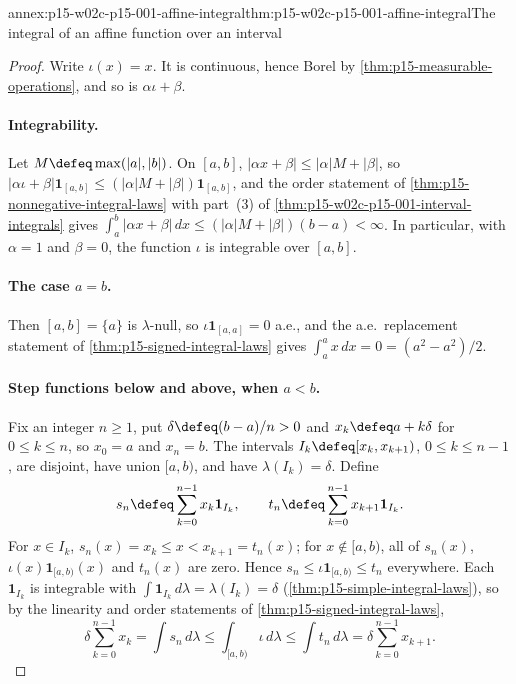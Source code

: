 \begin{annexitem}{annex:p15-w02c-p15-001-affine-integral}{thm:p15-w02c-p15-001-affine-integral}{The integral of an affine function over an interval}
\begin{proof}
Write \(\iota(x)=x\). It is continuous, hence Borel by
\cref{thm:p15-measurable-operations}, and so is \(\alpha\iota+\beta\).

\paragraph{Integrability.}
Let \(M\defeq\max(|a|,|b|)\). On \([a,b]\),
\(|\alpha x+\beta|\leq|\alpha|M+|\beta|\), so
\(|\alpha\iota+\beta|\mathbf1_{[a,b]}\leq(|\alpha|M+|\beta|)\mathbf1_{[a,b]}\),
and the order statement of \cref{thm:p15-nonnegative-integral-laws} with
part~(3) of \cref{thm:p15-w02c-p15-001-interval-integrals} gives
\(\int_a^b|\alpha x+\beta|\,dx\leq(|\alpha|M+|\beta|)(b-a)<\infty\). In
particular, with \(\alpha=1\) and \(\beta=0\), the function \(\iota\) is
integrable over \([a,b]\).

\paragraph{The case \(a=b\).}
Then \([a,b]=\{a\}\) is \(\lambda\)-null, so
\(\iota\mathbf1_{[a,a]}=0\) a.e., and the a.e.\ replacement statement of
\cref{thm:p15-signed-integral-laws} gives \(\int_a^ax\,dx=0=(a^2-a^2)/2\).

\paragraph{Step functions below and above, when \(a<b\).}
Fix an integer \(n\geq1\), put \(\delta\defeq(b-a)/n>0\) and
\(x_k\defeq a+k\delta\) for \(0\leq k\leq n\), so \(x_0=a\) and
\(x_n=b\). The intervals \(I_k\defeq[x_k,x_{k+1})\),
\(0\leq k\leq n-1\), are disjoint, have union \([a,b)\), and have
\(\lambda(I_k)=\delta\). Define
\[
 s_n\defeq\sum_{k=0}^{n-1}x_k\mathbf1_{I_k},\qquad
 t_n\defeq\sum_{k=0}^{n-1}x_{k+1}\mathbf1_{I_k}.
\]
For \(x\in I_k\), \(s_n(x)=x_k\leq x<x_{k+1}=t_n(x)\); for
\(x\notin[a,b)\), all of \(s_n(x)\), \(\iota(x)\mathbf1_{[a,b)}(x)\) and
\(t_n(x)\) are zero. Hence \(s_n\leq\iota\mathbf1_{[a,b)}\leq t_n\)
everywhere. Each \(\mathbf1_{I_k}\) is integrable with
\(\int\mathbf1_{I_k}\,d\lambda=\lambda(I_k)=\delta\)
(\cref{thm:p15-simple-integral-laws}), so by the linearity and order
statements of \cref{thm:p15-signed-integral-laws},
\[
 \delta\sum_{k=0}^{n-1}x_k
 =\int s_n\,d\lambda
 \leq\int_{[a,b)}\iota\,d\lambda
 \leq\int t_n\,d\lambda
 =\delta\sum_{k=0}^{n-1}x_{k+1}.
\]


\end{proof}
\end{annexitem}
